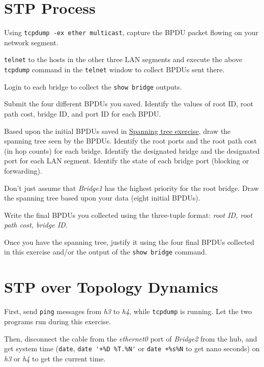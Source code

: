 \documentclass{../UTNetLab}
\begin{document}
\section{STP Process}
    Using \lstinline{tcpdump -ex ether multicast}, capture the BPDU packet flowing on your network segment.

    \lstinline{telnet} to the hosts in the other three LAN segments and execute the above \lstinline{tcpdump} command in the \lstinline{telnet} window to collect BPDUs sent there.

    Login to each bridge to collect the \lstinline[language={cisco}]{show bridge} outputs.
    
    \begin{report}
    \item \item Submit the four different BPDUs you saved.
    Identify the values of root ID, root path cost, bridge ID, and port ID for each BPDU.

    \item Based upon the initial BPDUs saved in \href{sec:spanning-tree}{Spanning tree exercise}, draw the spanning tree seen by the BPDUs. Identify the root ports and the root path cost (in hop counts) for each bridge.
    Identify the designated bridge and the designated port for each LAN segment.
    Identify the state of each bridge port (blocking or forwarding).

    Don’t just assume that \textit{Bridge1} has the highest priority for the root bridge.
    Draw the spanning tree based upon your data (eight initial BPDUs).

    \item Write the final BPDUs you collected using the three-tuple format: \textit{{root ID, root path cost, bridge ID}}.

    \item Once you have the spanning tree, justify it using the four final BPDUs collected in this exercise and/or the output of the \lstinline[language={cisco}]{show bridge} command.
    \end{report}


\section{STP over Topology Dynamics}
    First, send \lstinline{ping} messages from \textit{h3} to \textit{h4}, while \lstinline{tcpdump} is running.
    Let the two programs run during this exercise.

    Then, disconnect the cable from the \textit{ethernet0} port of \textit{Bridge2} from the hub, and get system time (\lstinline{date}, \lstinline{date '+%D %T.%N'} or \lstinline{date +%s%N} to get nano seconds) on \textit{h3} or \textit{h4} to get the current time.
\end{document}
